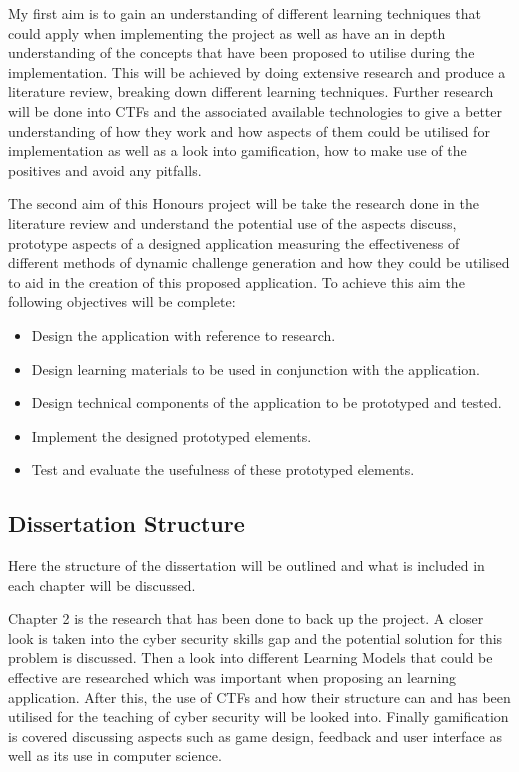 \documentclass[12pt,a4paper]{article}
\begin{document}
My first aim is to gain an understanding of different learning techniques that could apply when implementing the project as well as have an in depth understanding of the concepts that have been proposed to utilise during the implementation. This will be achieved by doing extensive research and produce a literature review, breaking down different learning techniques. Further research will be done into CTFs and the associated available technologies to give a better understanding of how they work and how aspects of them could be utilised for implementation as well as a look into gamification, how to make use of the positives and avoid any pitfalls.  

The second aim of this Honours project will be take the research done in the literature review and understand the potential use of the aspects discuss, prototype aspects of a designed application measuring the effectiveness of different methods of dynamic challenge generation and how they could be utilised to aid in the creation of this proposed application. To achieve this aim the following objectives will be complete:  

\begin{itemize}\itemsep0pt
	\item Design the application with reference to research.
	\item Design learning materials to be used in conjunction with the application.
	\item Design technical components of the application to be prototyped and tested. 
	\item Implement the designed prototyped elements. 
	\item Test and evaluate the usefulness of these prototyped elements.
\end{itemize}


\subsection{Dissertation Structure} 
Here the structure of the dissertation will be outlined and what is included in each chapter will be discussed. 

Chapter 2 is the research that has been done to back up the project. A closer look is taken into the cyber security skills gap and the potential solution for this problem is discussed. Then a look into different Learning Models that could be effective are researched which was important when proposing an learning application. After this, the use of CTFs and how their structure can and has been utilised for the teaching of cyber security will be looked into. Finally gamification is covered discussing aspects such as game design, feedback and user interface as well as its use in computer science.  
\end{document}
